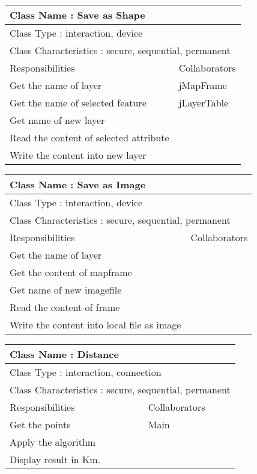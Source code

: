 \begin{tabular}{|l|l|}
  \hline
  \multicolumn{2}{|l|}{ Class Name : Save as Shape} \\
  \hline
  \multicolumn{2}{|l|}{ Class Type : interaction, device} \\
  \hline
  \multicolumn{2}{|l|}{ Class Characteristics : secure, sequential, permanent} \\
  \hline
  Responsibilities & Collaborators  \\
  \hline
  Get the name of layer & jMapFrame \\
  Get the name of selected feature & jLayerTable \\
  Get name of new layer & \\
  Read the content of selected attribute & \\
  Write the content into new layer & \\
  \hline
\end{tabular}

\begin{tabular}{|l|l|}
  \hline
  \multicolumn{2}{|l|}{ Class Name : Save as Image} \\
  \hline
  \multicolumn{2}{|l|}{ Class Type : interaction, device} \\
  \hline
  \multicolumn{2}{|l|}{ Class Characteristics : secure, sequential, permanent} \\
  \hline
  Responsibilities & Collaborators  \\
  \hline
  Get the name of layer & \\
  Get the content of mapframe & \\
  Get name of new imagefile & \\
  Read the content of frame & \\
  Write the content into local file as image & \\
  \hline
\end{tabular}

\begin{tabular}{|l|l|}
  \hline
  \multicolumn{2}{|l|}{ Class Name : Distance} \\
  \hline
  \multicolumn{2}{|l|}{ Class Type : interaction, connection} \\
  \hline
  \multicolumn{2}{|l|}{ Class Characteristics : secure, sequential, permanent} \\
  \hline
  Responsibilities & Collaborators  \\
  \hline
  Get the points & Main \\
  Apply the algorithm & \\
  Display result in Km. & \\
  \hline
\end{tabular}

